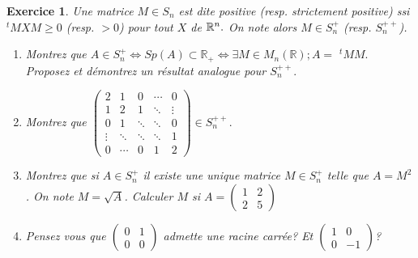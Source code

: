 \documentclass[12pt,a4paper]{article}
\newcommand{\R}{\mathbb{R}}
\theoremstyle{break}
\newtheorem{Exo}{Exercice}
\begin{document}
%	
	\newpage
	 \begin{Exo}
	 	Une matrice $M\in S_{n}$ est dite positive (resp. strictement
	positive) ssi $^{t}MXM\geq 0$ (resp. $>0$) pour tout $X$ de $\Bbb{R}^{n}.$
	On note alors $M\in S_{n}^{+}$ (resp. $S_{n}^{++}$).
	
	\begin{enumerate}
		\item  Montrez que $A\in S_{n}^{+}\iff  Sp\left( A\right) \subset 
		\R_{+}\Leftrightarrow \exists M\in M_n(\R) ;A=$ $%
		^{t}MM.$ Proposez et d\'{e}montrez un r\'{e}sultat analogue pour $%
		S_{n}^{++}. $
		
		\item  Montrez que $\left( 
		\begin{array}{lllll}
			2 & 1 & 0 & \cdots & 0 \\ 
			1 & 2 & 1 & \ddots & \vdots \\ 
			0 & 1 & \ddots & \ddots & 0 \\ 
			\vdots & \ddots & \ddots & \ddots & 1 \\ 
			0 & \cdots & 0 & 1 & 2
		\end{array}
		\right) \in S_{n}^{++}.$
		
		\item  Montrez que si $A\in S_{n}^{+}$ il existe une unique matrice $M\in
		S_{n}^{+}$ telle que $A=M^{2}$. On note $M=\sqrt{A}$. Calculer $M$ si $A=\left( 
		\begin{array}{ll}
			1 & 2 \\ 
			2 & 5
		\end{array}
		\right) $
		\item Pensez vous que  $\begin{pmatrix}
			0 & 1 \\
			0 & 0
		\end{pmatrix}$ admette une racine carrée? Et $\begin{pmatrix}
		1& 0 \\
		0 & -1
	\end{pmatrix}$?
	\end{enumerate}
	 \end{Exo}
 
\end{document}
